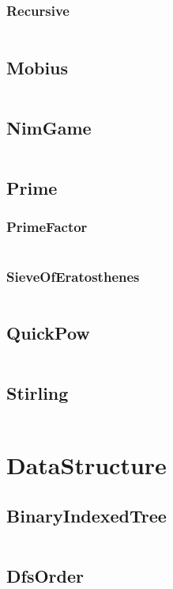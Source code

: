 \documentclass[a4paper,11pt]{article}
\begin{document}
\subsubsection{Recursive}
\inputminted[breaklines]{c++}{02++Math/+InverseElement/+Recursive.cpp}

\subsection{Mobius}
\inputminted[breaklines]{c++}{02++Math/+Mobius.cpp}
\subsection{NimGame}
\inputminted[breaklines]{c++}{02++Math/+NimGame.cpp}
\subsection{Prime}
\subsubsection{PrimeFactor}
\inputminted[breaklines]{c++}{02++Math/+Prime/+PrimeFactor.cpp}
\subsubsection{SieveOfEratosthenes}
\inputminted[breaklines]{c++}{02++Math/+Prime/+SieveOfEratosthenes.cpp}

\subsection{QuickPow}
\inputminted[breaklines]{c++}{02++Math/+QuickPow.cpp}
\subsection{Stirling}
\inputminted[breaklines]{c++}{02++Math/+Stirling.cpp}

\newpage
\section{DataStructure}
\subsection{BinaryIndexedTree}
\inputminted[breaklines]{c++}{03++DataStructure/+BinaryIndexedTree.cpp}
\subsection{DfsOrder}
\inputminted[breaklines]{c++}{03++DataStructure/+DfsOrder.cpp}
\end{document}
